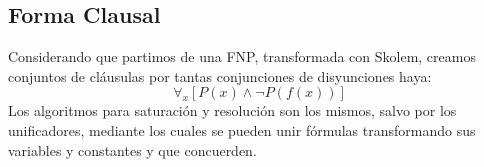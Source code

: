 \subsection{Forma Clausal}
\noindent Considerando que partimos de una FNP, transformada con Skolem, creamos conjuntos de cláusulas por tantas conjunciones de disyunciones haya:
\[
        \boxed{
                \forall_x \left [ P(x) \land \neg P(f(x)) \right ]}
\]
\noindent Los algoritmos para saturación y resolución son los mismos, salvo por los unificadores, mediante los cuales se pueden unir fórmulas transformando sus variables y constantes y que concuerden.